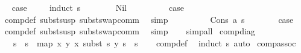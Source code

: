 \begin{isabellebody}
\ \isamarkupfalse%
\ {\isacharquery}{\kern0pt}case\ \isanewline
\ \ \ \isamarkupfalse%
{\isacharparenleft}{\kern0pt}induct\ s{}{\isacharparenright}{\kern0pt}\isanewline
\ \ \ \ \ \ \isamarkupfalse%
\ Nil\isanewline
\ \ \ \ \ \ \isamarkupfalse%
\ \isamarkupfalse%
\ {\isacharquery}{\kern0pt}case\ \isamarkupfalse%
\ comp{\isacharunderscore}{\kern0pt}def\ subst{\isacharunderscore}{\kern0pt}susp\ subst{\isacharunderscore}{\kern0pt}swap{\isacharunderscore}{\kern0pt}comm\ \isamarkupfalse%
\ simp\isanewline
\ \ \ \isamarkupfalse%
\isanewline
\ \ \ \ \isamarkupfalse%
\ {\isacharparenleft}{\kern0pt}Cons\ a\ s{}{\isacharparenright}{\kern0pt}\isanewline
\ \ \ \ \isamarkupfalse%
\ \isamarkupfalse%
\ {\isacharquery}{\kern0pt}case\ \isamarkupfalse%
\ comp{\isacharunderscore}{\kern0pt}def\ subst{\isacharunderscore}{\kern0pt}susp\ subst{\isacharunderscore}{\kern0pt}swap{\isacharunderscore}{\kern0pt}comm\ \isamarkupfalse%
\ simp\isanewline
\ \ \isamarkupfalse%
\isanewline
{}\isamarkupfalse%
\ {\isacharparenleft}{\kern0pt}simp{\isacharunderscore}{\kern0pt}all{\isacharparenright}{\kern0pt}%
\endisatagproof
{\isafoldproof}%
%
\isadelimproof
\isanewline
%
\endisadelimproof
\isanewline
{}\isamarkupfalse%
\ comp{\isacharunderscore}{\kern0pt}diag{\isacharcolon}{\kern0pt}\isanewline
\ \ \ {\isachardoublequoteopen}s{}\ {\isasymbullet}\ s{}\ {\isacharequal}{\kern0pt}\ map\ {\isacharparenleft}{\kern0pt}{\isasymlambda}{\isacharparenleft}{\kern0pt}x{\isacharcomma}{\kern0pt}\ y{\isacharparenright}{\kern0pt}{\isachardot}{\kern0pt}\ {\isacharparenleft}{\kern0pt}x{\isacharcomma}{\kern0pt}\ subst\ s{}\ y{\isacharparenright}{\kern0pt}{\isacharparenright}{\kern0pt}\ s{}\ {\isacharat}{\kern0pt}\ s{}{\isachardoublequoteclose}\isanewline
%
\isadelimproof
\ \ %
\endisadelimproof
%
\isatagproof
{}\isamarkupfalse%
\ comp{\isacharunderscore}{\kern0pt}def\ \isamarkupfalse%
\ {\isacharparenleft}{\kern0pt}induct\ s{}{\isacharparenright}{\kern0pt}\ auto%
\endisatagproof
{\isafoldproof}%
%
\isadelimproof
\isanewline
%
\endisadelimproof
\isanewline
{}\isamarkupfalse%
\ comp{\isacharunderscore}{\kern0pt}assoc{\isacharcolon}{\kern0pt}\isanewline

\end{isabellebody}
